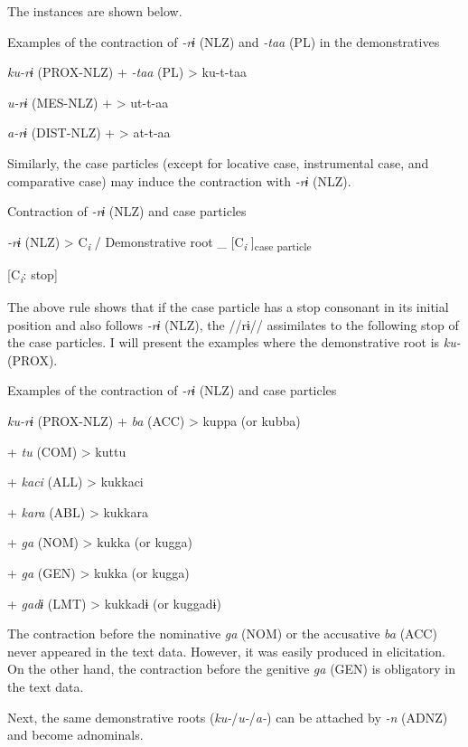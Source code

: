 The instances are shown below.

\ea \label{ex:5:19}   Examples of the contraction of \textit{{}-rɨ} (NLZ) and \textit{{}-taa} (PL) in the demonstratives

  \textit{ku-rɨ}  (PROX-NLZ)  +  \textit{{}-taa} (PL)  >  ku-t-taa

  \textit{u-rɨ}  (MES-NLZ)  +      >  ut-t-aa

  \textit{a-rɨ}  (DIST-NLZ)  +      >  at-t-aa
\z

Similarly, the case particles (except for locative case, instrumental case, and comparative case) may induce the contraction with \textit{{}-rɨ} (NLZ).

\ea \label{ex:5:20}   Contraction of \textit{{}-rɨ} (NLZ) and case particles

  \textit{{}-rɨ} (NLZ)  >  C\textit{\textsubscript{i}}  /  Demonstrative root  \_  [C\textit{\textsubscript{i}}      ]\textsubscript{case particle}

                [C\textit{\textsubscript{i}}: stop]
\z

The above rule shows that if the case particle has a stop consonant in its initial position and also follows \textit{{}-rɨ} (NLZ), the //rɨ// assimilates to the following stop of the case particles. I will present the examples where the demonstrative root is \textit{ku-} (PROX).

\ea \label{ex:5:21}   Examples of the contraction of \textit{{}-rɨ} (NLZ) and case particles

  \textit{ku-rɨ}  (PROX-NLZ)  +  \textit{ba}  (ACC)  >  kuppa  (or kubba)

      +  \textit{tu}  (COM)  >  kuttu  

      +  \textit{kaci}  (ALL)  >  kukkaci  

      +  \textit{kara}  (ABL)  >  kukkara  

      +  \textit{ga}  (NOM)  >  kukka  (or kugga)

      +  \textit{ga}  (GEN)  >  kukka  (or kugga)

      +  \textit{gadɨ}  (LMT)  >  kukkadɨ  (or kuggadɨ)
\z

The contraction before the nominative \textit{ga} (NOM) or the accusative \textit{ba} (ACC) never appeared in the text data. However, it was easily produced in elicitation. On the other hand, the contraction before the genitive \textit{ga} (GEN) is obligatory in the text data.

Next, the same demonstrative roots (\textit{ku-}/\textit{u-}/\textit{a-}) can be attached by \textit{{}-n} (ADNZ) and become adnominals.

